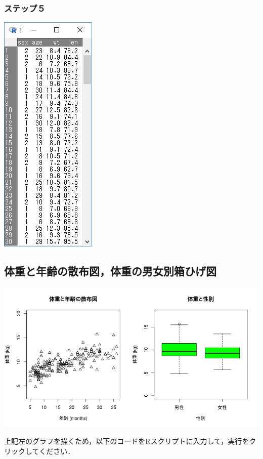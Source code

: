 \documentclass[11pt,]{problemset}
\newenvironment{Shaded}{\begin{snugshade}}{\end{snugshade}}
\newcommand{\DataTypeTok}[1]{\textcolor[rgb]{0.13,0.29,0.53}{#1}}
\newcommand{\DecValTok}[1]{\textcolor[rgb]{0.00,0.00,0.81}{#1}}
\newcommand{\KeywordTok}[1]{\textcolor[rgb]{0.13,0.29,0.53}{\textbf{#1}}}
\newcommand{\NormalTok}[1]{#1}
\newcommand{\OperatorTok}[1]{\textcolor[rgb]{0.81,0.36,0.00}{\textbf{#1}}}
\newcommand{\StringTok}[1]{\textcolor[rgb]{0.31,0.60,0.02}{#1}}
\begin{document}
\hypertarget{-4}{%
\subsubsection{ステップ５}\label{-4}}

\begin{center}\includegraphics[width=0.2\linewidth]{pic/import05} \end{center}

\subsection{体重と年齢の散布図，体重の男女別箱ひげ図}

\begin{center}\includegraphics[width=0.85\linewidth]{pic/scatter00} \end{center}

上記左のグラフを描くため，以下のコードをRスクリプトに入力して，実行をクリックしてください．

\begin{Shaded}
\end{Shaded}
\end{document}
